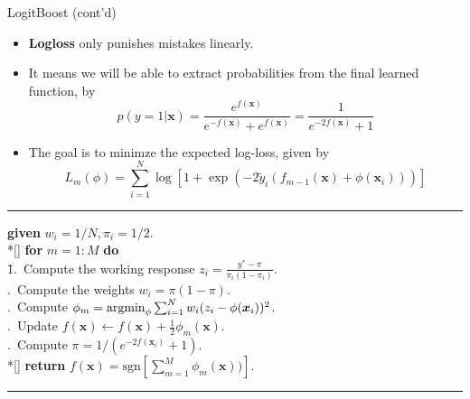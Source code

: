 \documentclass[10pt,mathserif]{beamer}
\begin{document}
\begin{frame}{LogitBoost (cont'd)}
\begin{itemize}
    \item \textbf{Logloss} only punishes mistakes linearly.
    \item It means we will be able to extract probabilities from the final learned function, by \begin{equation*}
        p(y = 1|\bm{x}) = \frac{e^{f(\bm{x})}}{e^{-f(\bm{x})} + e^{f(\bm{x})}} = \frac{1}{e^{-2f(\bm{x})} + 1}
    \end{equation*}
    \item The goal is to minimze the expected log-loss, given by
    \begin{equation*}
        L_m(\phi) = \sum_{i=1}^N \log \left[1 + \exp(-2\tilde{y}_i(f_{m-1}(\bm{x}) + \phi(\bm{x}_i)))\right]
    \end{equation*}
\end{itemize}

\noindent\rule[-5pt]{\textwidth}{0.4pt}
{\footnotesize
\begin{tabbing}
    {\bf given} $w_i= 1/N, \pi_i =1/2$. \\*[\smallskipamount]
    {\bf for} $m=1:M$ {\bf do}\\
    \qquad \= 1.\ Compute the working response $z_i =\frac{y^* - \pi}{\pi_i(1 - \pi_i)}$. \\
    .\ Compute the weights $w_i = \pi(1 - \pi)$. \\
    .\ Compute $\phi_m = \mathop{\rm argmin}_\phi \sum_{i=1}^N w_i(z_i-\phi(\bm{x}_i))^2$. \\
    .\ Update $f(\bm{x}) \leftarrow f(\bm{x}) + \frac{1}{2}\phi_m(\bm{x})$. \\
    .\ Compute $\pi = 1/(e^{-2f(\bm{x}_i)} + 1)$. \\*[\smallskipamount]
    {\bf return} $f(\bm{x})=\text{sgn}\left[\sum_{m=1}^M\phi_m(\bm{x}))\right]$.
\end{tabbing}}
\noindent\rule[10pt]{\textwidth}{0.4pt}
\end{frame}
\end{document}
